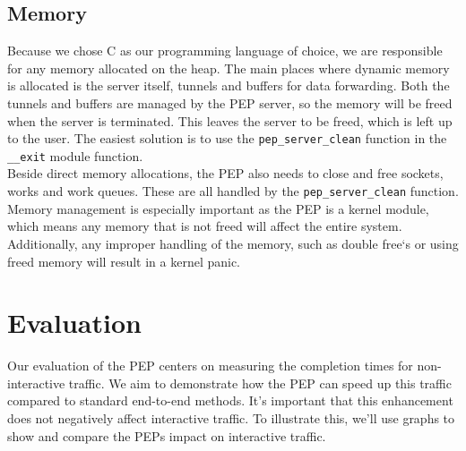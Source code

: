 \documentclass[a4paper,english, 12pt]{report}
\begin{document}
\section{Memory}
Because we chose C as our programming language of choice, we are responsible for any memory allocated on the heap. The main places where dynamic memory is allocated is the server itself, tunnels and buffers for data forwarding. Both the tunnels and buffers are managed by the PEP server, so the memory will be freed when the server is terminated. This leaves the server to be freed, which is left up to the user. The easiest solution is to use the \verb|pep_server_clean| function in the \verb|__exit| module function.\\

Beside direct memory allocations, the PEP also needs to close and free sockets, works and work queues. These are all handled by the \verb|pep_server_clean| function. Memory management is especially important as the PEP is a kernel module, which means any memory that is not freed will affect the entire system. Additionally, any improper handling of the memory, such as double free`s or using freed memory will result in a kernel panic.\\

\chapter{Evaluation}
Our evaluation of the PEP centers on measuring the completion times for non-interactive traffic. We aim to demonstrate how the PEP can speed up this traffic compared to standard end-to-end methods. It's important that this enhancement does not negatively affect interactive traffic. To illustrate this, we'll use graphs to show and compare the PEPs impact on interactive traffic.

%
\end{document}
